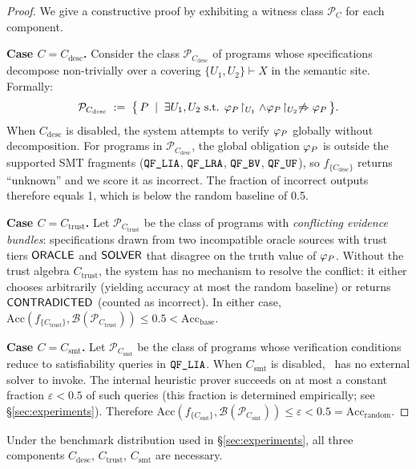 \documentclass[11pt]{article}
\newcommand{\Acc}{\mathrm{Acc}}             %
\newcommand{\AccBase}{\Acc_{\mathrm{base}}} %
\newcommand{\PClass}[1]{\mathcal{P}_{#1}}   %
\newcommand{\Random}{\mathrm{random}}       %
\newcommand{\DescComp}{C_{\mathrm{desc}}}   %
\newcommand{\TrustComp}{C_{\mathrm{trust}}} %
\newcommand{\SMTComp}{C_{\mathrm{smt}}}     %
\begin{document}
\begin{proof}
We give a constructive proof by exhibiting a witness class $\PClass{C}$
for each component.

\medskip
\noindent\textbf{Case $C = \DescComp$.}
Consider the class $\PClass{\DescComp}$ of programs whose specifications
decompose non-trivially over a covering
$\{U_1, U_2\} \vdash X$ in the semantic site.  Formally:
\[
  \PClass{\DescComp}
  \;:=\;
  \bigl\{\, P \;\mid\; \exists U_1, U_2 \text{ s.t. }
    \prop_P\!\upharpoonright_{U_1} \wedge \prop_P\!\upharpoonright_{U_2}
    \not\Rightarrow \prop_P
  \,\bigr\}.
\]
When $\DescComp$ is disabled, the system attempts to verify $\varphi_P$
globally without decomposition.  For programs in $\PClass{\DescComp}$,
the global obligation $\varphi_P$ is outside the supported SMT fragments
($\texttt{QF\_LIA}$, $\texttt{QF\_LRA}$, $\texttt{QF\_BV}$, $\texttt{QF\_UF}$), so $f_{\{\DescComp\}}$ returns
``unknown'' and we score it as incorrect.  The fraction of incorrect
outputs therefore equals 1, which is below the random baseline of 0.5.

\medskip
\noindent\textbf{Case $C = \TrustComp$.}
Let $\PClass{\TrustComp}$ be the class of programs with \emph{conflicting
evidence bundles}: specifications drawn from two incompatible oracle
sources with trust tiers $\mathsf{ORACLE}$ and $\mathsf{SOLVER}$ that disagree on the
truth value of $\varphi_P$.  Without the trust algebra $\TrustComp$, the
system has no mechanism to resolve the conflict: it either chooses
arbitrarily (yielding accuracy at most the random baseline) or returns
$\mathsf{CONTRADICTED}$ (counted as incorrect).  In either case,
$\Acc(f_{\{\TrustComp\}}, \mathcal{B}(\PClass{\TrustComp})) \leq 0.5
< \AccBase$.

\medskip
\noindent\textbf{Case $C = \SMTComp$.}
Let $\PClass{\SMTComp}$ be the class of programs whose verification
conditions reduce to satisfiability queries in $\texttt{QF\_LIA}$.  When $\SMTComp$
is disabled, \JuGeo\ has no external solver to invoke.  The internal
heuristic prover succeeds on at most a constant fraction
$\varepsilon < 0.5$ of such queries (this fraction is determined
empirically; see §\ref{sec:experiments}).  Therefore
$\Acc(f_{\{\SMTComp\}}, \mathcal{B}(\PClass{\SMTComp})) \leq \varepsilon
< 0.5 = \Acc_{\Random}$.
\end{proof}

\begin{corollary}
\label{cor:no-redundant}
Under the benchmark distribution used in §\ref{sec:experiments}, all
three components $\DescComp$, $\TrustComp$, $\SMTComp$ are necessary.
\end{corollary}
\end{document}
